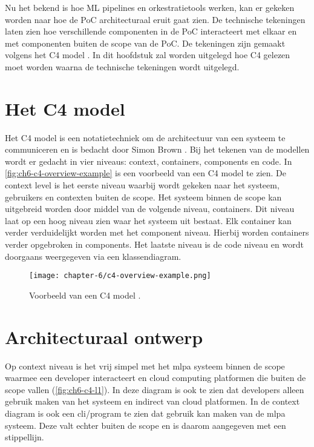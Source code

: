 Nu het bekend is hoe ML pipelines en orkestratietools werken, kan er gekeken worden naar hoe de PoC architecturaal eruit gaat zien. De technische tekeningen laten zien hoe verschillende componenten in de PoC interacteert met elkaar en met componenten buiten de scope van de PoC. De tekeningen zijn gemaakt volgens het C4 model \cite{c4-model}. In dit hoofdstuk zal worden uitgelegd hoe C4 gelezen moet worden waarna de technische tekeningen wordt uitgelegd.

\section{Het C4 model}\label{sec:ch6-het-c4-model}
Het C4 model is een notatietechniek om de architectuur van een systeem te communiceren en is bedacht door Simon Brown \cite{c4-model}. Bij het tekenen van de modellen wordt er gedacht in vier niveaus: context, containers, components en code. In \autoref{fig:ch6-c4-overview-example} is een voorbeeld van een C4 model te zien. De context level is het eerste niveau waarbij wordt gekeken naar het systeem, gebruikers en contexten buiten de scope. Het systeem binnen de scope kan uitgebreid worden door middel van de volgende niveau, containers. Dit niveau laat op een hoog niveau zien waar het systeem uit bestaat. Elk container kan verder verduidelijkt worden met het component niveau. Hierbij worden containers verder opgebroken in components. Het laatste niveau is de code niveau en wordt doorgaans weergegeven via een klassendiagram. 

\begin{figure}[hbt!]
  \centering
  \texttt{[image: chapter-6/c4-overview-example.png]}
  \caption{Voorbeeld van een C4 model \cite{c4-model}.}
  \label{fig:ch6-c4-overview-example}
\end{figure}

\newpage

\section{Architecturaal ontwerp}\label{sec:ch6-architecturaal-ontwerp}
Op context niveau is het vrij simpel met het \acrfull{mlpa} systeem binnen de scope waarmee een developer interacteert en cloud computing platformen die buiten de scope vallen (\autoref{fig:ch6-c4-l1}). In deze diagram is ook te zien dat developers alleen gebruik maken van het systeem en indirect van cloud platformen. In de context diagram is ook een \acrfull{cli}/program te zien dat gebruik kan maken van de \acrshort{mlpa} systeem. Deze valt echter buiten de scope en is daarom aangegeven met een stippellijn.

